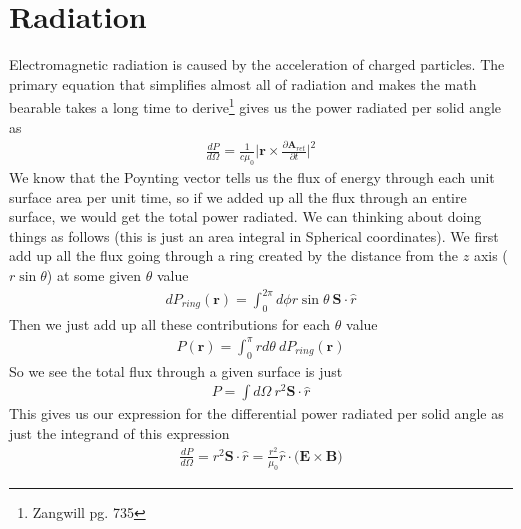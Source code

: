 \section{Radiation}
Electromagnetic radiation is caused by the acceleration of charged particles. The primary equation that simplifies almost all of radiation and makes the math bearable takes a long time to derive\footnote{Zangwill pg. 735} gives us the power radiated per solid angle as %
\begin{align}\label{powerdistribution}
    \frac{dP}{d\Omega} = \frac{1}{c\mu_0}\Big| \textbf{r}\times\frac{\partial \textbf{A}_{ret}}{\partial t}\Big|^2
\end{align}
We know that the Poynting vector tells us the flux of energy through each unit surface area per unit time, so if we added up all the flux through an entire surface, we would get the total power radiated. We can thinking about doing things as follows (this is just an area integral in Spherical coordinates). We first add up all the flux going through a ring created by the distance from the $z$ axis ($r\sin\theta$) at some given $\theta$ value
\begin{align}
    dP_{ring} (\textbf{r}) = \int_0^{2\pi} d\phi r\sin\theta ~\textbf{S}\cdot\hat{r}
\end{align}
Then we just add up all these contributions for each $\theta$ value
\begin{align}
    P (\textbf{r}) = \int_0^\pi r d\theta~ dP_{ring} (\textbf{r})
\end{align}
So we see the total flux through a given surface is just 
\begin{align}
    P = \int d\Omega  ~r^2 \textbf{S}\cdot{\hat{r}}
\end{align}
This gives us our expression for the differential power radiated per solid angle as just the integrand of this expression 
\begin{align}
    \frac{dP}{d\Omega} = r^2\textbf{S}\cdot\hat{r} = \frac{r^2}{\mu_0} \hat{r}\cdot\Big(\textbf{E}\times\textbf{B}\Big)
\end{align}


